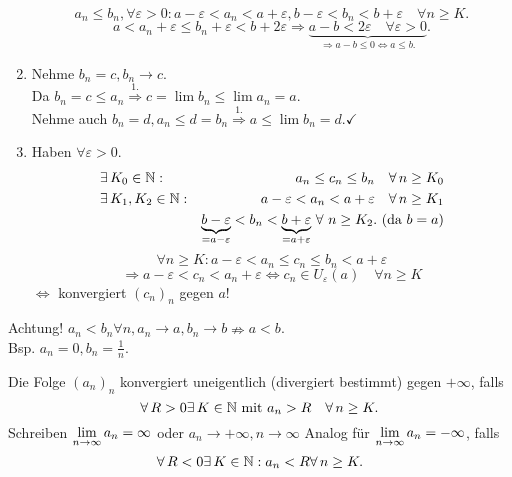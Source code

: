\documentclass[../ana1.tex]{subfiles}
\begin{document}
\begin{bew}
\begin{enumerate}
		\[ a_n \leq b_n, \forall \varepsilon > 0: a-\varepsilon < a_n<a + \varepsilon, b-\varepsilon < b_n < b + \varepsilon \quad \forall n\geq K. \]
		\[ a < a_n + \varepsilon \leq b_n + \varepsilon < b + 2\varepsilon \Rightarrow \underbrace{a-b < 2\varepsilon \quad \forall \varepsilon > 0}_{\Rightarrow a-b\leq 0 \Leftrightarrow a\leq b.}. \]
		\item Nehme \(b_n = c, b_n \rightarrow c\).\\
		Da \(b_n = c \leq a_n \overset{1.}{\Rightarrow} c= \lim b_n \leq \lim a_n = a \).\\
		Nehme auch \(b_n = d, a_n \leq d = b_n \overset{1.}{\Rightarrow} a \leq \lim b_n = d. \checkmark \)
		\item Haben \(\forall \varepsilon > 0\).
		\begin{align*}
			&\exists K_0 \in\N: &a_n \leq c_n \leq b_n \quad \forall n\geq K_0\\
			&\exists K_1, K_2 \in\N: &a-\varepsilon < a_n < a + \varepsilon \quad \forall n\geq K_1\\
			&&\underbrace{b-\varepsilon}_{=a-\varepsilon} < b_n < \underbrace{b + \varepsilon}_{=a+\varepsilon} \, \forall \, n \geq K_2. \text{ (da }b=a)
		\end{align*}
		\[\forall  n\geq K: a-\varepsilon < a_n \leq c_n \leq b_n < a+\varepsilon \]
		\[ \Rightarrow a-\varepsilon < c_n < a_n + \varepsilon \Leftrightarrow c_n\in U_\varepsilon(a) \quad \forall n\geq K \] 
		\( \Leftrightarrow \) konvergiert \( {(c_n)}_n \) gegen \( a \)!
	\end{enumerate}
\end{bew}

Achtung! \( a_n < b_n \forall n, a_n \rightarrow a, b_n \rightarrow b \nRightarrow  a<b\).\\
Bsp. \(a_n = 0, b_n = \frac{1}{n}\).

\begin{defi}
	Die Folge \( {(a_n)}_n \) konvergiert uneigentlich (divergiert bestimmt) gegen \(+\infty \), falls 
	\[ \forall R>0 \exists K\in\N \text{ mit } a_n > R \quad \forall n\geq K. \]
	Schreiben \( \lim\limits_{n\rightarrow\infty} a_n = \infty \) oder \( a_n \rightarrow +\infty, n\rightarrow \infty \)
	Analog für \( \lim\limits_{n\rightarrow\infty} a_n = -\infty \), falls 
	\[ \forall R<0 \exists K\in\N: a_n < R \forall n\geq K. \]
\end{defi}
\end{document}
